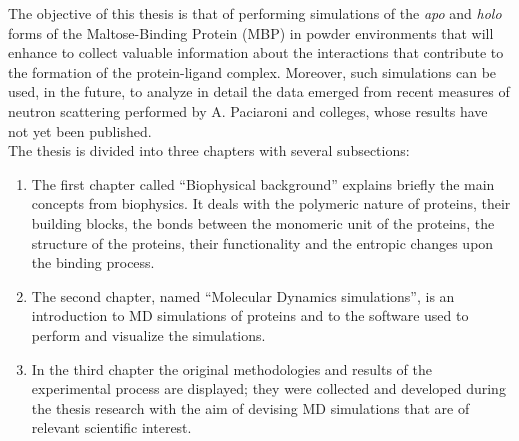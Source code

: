 The objective of this thesis is that of performing simulations of the \textit{apo} and \textit{holo} forms of the Maltose-Binding Protein (MBP) in powder environments that will enhance to collect valuable information about the interactions that contribute to the formation of the protein-ligand complex. Moreover, such simulations can be used, in the future, to analyze in detail the data emerged from recent measures of neutron scattering performed by A. Paciaroni and colleges, whose results have not yet been published.\\

The thesis is divided into three chapters with several subsections:
\begin{enumerate}
\item The first chapter called ``Biophysical background'' explains briefly the main concepts from biophysics. It deals with the polymeric nature of proteins, their building blocks, the bonds between the monomeric unit of the proteins, the structure of the proteins, their functionality and the entropic changes upon the binding process.
\item The second chapter, named ``Molecular Dynamics simulations'', is an introduction to MD simulations of proteins and to the software used to perform and visualize the simulations.
\item In the third chapter the original methodologies and results of the experimental process are displayed; they were collected and developed during the thesis research with the aim of devising MD simulations that are of relevant scientific interest.
\end{enumerate}
